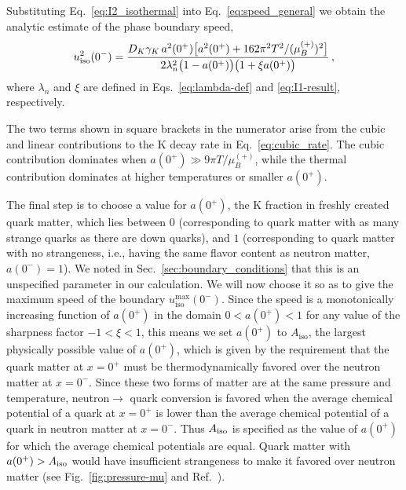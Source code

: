 \documentclass[10pt,superscriptaddress,
amsmath,aps,prc,twocolumn,nofootinbib,floatfix]{revtex4-1}
\newcommand{\mga}[1]{{\color[rgb]{0.6,0,0}#1}}
\newcommand{\mgacom}[1]{\textsf{\color[rgb]{0.8,0,0}[\textsuperscript{MGA} #1]}}
\newcommand{\Bratio}{\lambda_n}
\begin{document}
Substituting Eq.~\eqref{eq:I2_isothermal} into Eq.~\eqref{eq:speed_general} \mga{we obtain the analytic estimate of the phase boundary speed,}
\begin{equation}
 u_{\rm iso}^2(0^-)=\frac{D_K\gamma_K\,a^2(0^+)\bigl[a^2(0^+)+162\pi^2T^2/(\mu_B^{(+)})^2\bigr]}
 {2\Bratio^2\bigl(1-a(0^+)\bigr)\bigl(1+\xi a(0^+)\bigr)}\,,
\label{eq:speed_isothermal}
\end{equation}
where $\Bratio$ and $\xi$ are defined in Eqs.~\eqref{eq:lambda-def} and \eqref{eq:I1-result}, respectively.

The two terms shown in square brackets in the numerator arise from the cubic and linear contributions to the K decay rate in Eq.~\eqref{eq:cubic_rate}.
The cubic contribution dominates when \mga{$a(0^+)\gg 9\pi T/\mu_B^{(+)}$}, while the thermal contribution dominates at \mga{higher temperatures or smaller $a(0^+)$.}

\mga{The final step is to choose a value for $a(0^+)$, the K fraction in freshly created quark matter, which lies between 0 (corresponding to quark matter with as many strange quarks as there are down quarks), and $1$ (corresponding to quark matter with no strangeness, i.e., having the same flavor content as neutron matter, $a(0^-)=1$). We noted in Sec.~\ref{sec:boundary_conditions} that this is an unspecified parameter in our calculation. } \mga{We will now choose it so as to give the maximum speed of the boundary $u^{\max}_\text{iso}(0^-)$. Since the speed is a monotonically increasing function of $a(0^+)$ in the domain $0<a(0^+)<1$ for any value of the sharpness factor $-1<\xi<1$, this means we set $a(0^+)$ to $A_{\text{iso}}$, the largest physically possible value of $a(0^+)$, which is given by the requirement that the quark matter at $x=0^+$ must be thermodynamically favored over the neutron matter at $x=0^-$. Since these two forms of matter are at the same pressure and temperature, neutron$\to$ quark conversion is favored when
the average chemical potential of a quark at $x=0^+$ is lower than the average chemical potential of a quark in neutron matter at $x=0^-$. Thus $A_{\rm iso}$ is specified as the value of $a(0^+)$ for which the average chemical potentials are equal.
Quark matter with $a(0^+)>A_{\rm iso}$ would have insufficient strangeness to make it favored over neutron matter (see Fig.~\ref{fig:pressure-mu} and Ref.~\cite{Alford:2014jha}).}
\end{document}
